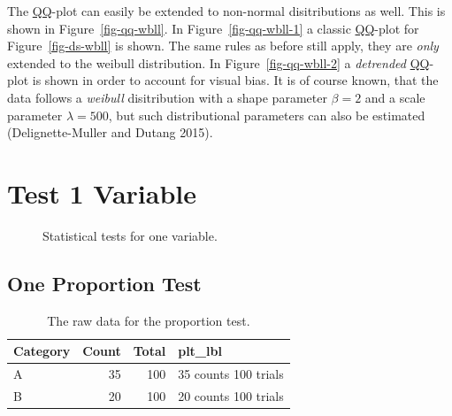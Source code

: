 \documentclass[
  a4paper,
]{scrbook}
\begin{document}
The \hyperref[qq]{QQ}-plot can easily be extended to non-normal
disitributions as well. This is shown in Figure~\ref{fig-qq-wbll}. In
Figure~\ref{fig-qq-wbll-1} a classic \hyperref[qq]{QQ}-plot for
Figure~\ref{fig-ds-wbll} is shown. The same rules as before still apply,
they are \emph{only} extended to the weibull distribution. In
Figure~\ref{fig-qq-wbll-2} a \emph{detrended} \hyperref[qq]{QQ}-plot is
shown in order to account for visual bias. It is of course known, that
the data follows a \emph{weibull} disitribution with a shape parameter
\(\beta=2\) and a scale parameter \(\lambda = 500\), but such
distributional parameters can also be estimated (Delignette-Muller and
Dutang 2015).

\section{Test 1 Variable}\label{test-1-variable}

\begin{figure}[H]


\caption{\label{fig-tests-OneVar}Statistical tests for one variable.}

\end{figure}%

\subsection{One Proportion Test}\label{one-proportion-test}

\begingroup
\fontsize{12.0pt}{14.4pt}\selectfont

\begin{longtable}{lrrl}

\caption{\label{tbl-prop-test-data}The raw data for the proportion
test.}

\tabularnewline

\toprule
Category & Count & Total & plt\_lbl \\ 
\midrule\addlinespace[2.5pt]
A & 35 & 100 & 35  counts
 100  trials \\ 
B & 20 & 100 & 20  counts
 100  trials \\ 
\bottomrule

\end{longtable}
\end{document}
